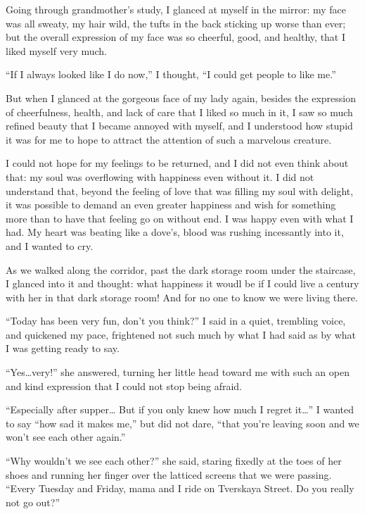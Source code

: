 Going through grandmother's study, I glanced at myself in the mirror: my face was all sweaty, my hair wild, the tufts in the back sticking up worse than ever; but the overall expression of my face was so cheerful, good, and healthy, that I liked myself very much.

``If I always looked like I do now,'' I thought, ``I could get people to like me.'' %

But when I glanced at the gorgeous face of my lady again, besides the expression of cheerfulness, health, and lack of care that I liked so much in it, I saw so much refined beauty that I became annoyed with myself, and I understood how stupid it was for me to hope to attract the attention of such a marvelous creature.

I could not hope for my feelings to be returned, and I did not even think about that: my soul was overflowing with happiness even without it. I did not understand that, beyond the feeling of love that was filling my soul with delight, it was possible to demand an even greater happiness and wish for something more than to have that feeling go on without end. I was happy even with what I had. My heart was beating like a dove's, blood was rushing incessantly into it, and I wanted to cry.

As we walked along the corridor, past the dark storage room under the staircase, I glanced into it and thought: what happiness it woudl be if I could live a century with her in that dark storage room! And for no one to know we were living there.

``Today has been very fun, don't you think?'' I said in a quiet, trembling voice, and quickened my pace, frightened not such much by what I had said as by what I was getting ready to say. %

``Yes\ldots{}very!'' she answered, turning her little head toward me with such an open and kind expression that I could not stop being afraid. %

``Especially after supper\ldots{} But if you only knew how much I regret it\ldots{}'' I wanted to say ``how sad it makes me,'' but did not dare, ``that you're leaving soon and we won't see each other again.'' %

``Why wouldn't we see each other?'' she said, staring fixedly at the toes of her shoes and running her finger over the latticed screens that we were passing. ``Every Tuesday and Friday, mama and I ride on Tverskaya Street. Do you really not go out?'' %

